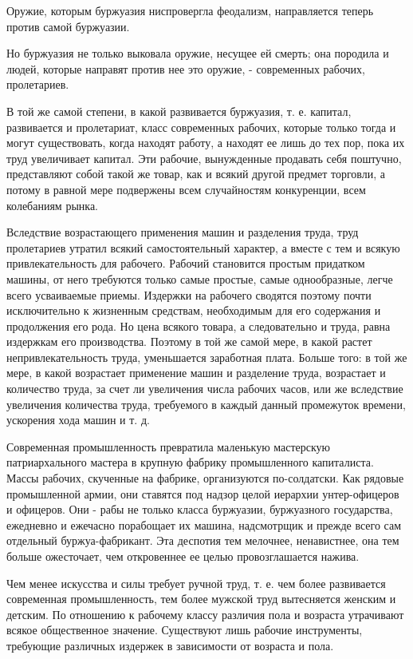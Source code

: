 \documentclass[12pt]{article}
\newcommand{\parnum}{(\arabic{parcount})}
\newcounter{parcount}
\newenvironment{parnumbers}{%
  \par%
  \everypar{\noindent \stepcounter{parcount}\marginpar[]{\parnum}}%
}{}
\begin{document}
\begin{parnumbers}
    Оружие, которым буржуазия ниспровергла феодализм, направляется теперь против самой буржуазии.

    Но буржуазия не только выковала оружие, несущее ей смерть; она породила и людей, которые направят против нее это оружие, - современных рабочих, пролетариев.

    В той же самой степени, в какой развивается буржуазия, т. е. капитал, развивается и пролетариат, класс современных рабочих, которые только тогда и могут существовать, когда находят работу, а находят ее лишь до тех пор, пока их труд увеличивает капитал. Эти рабочие, вынужденные продавать себя поштучно, представляют собой такой же товар, как и всякий другой предмет торговли, а потому в равной мере подвержены всем случайностям конкуренции, всем колебаниям рынка.

    Вследствие возрастающего применения машин и разделения труда, труд пролетариев утратил всякий самостоятельный характер, а вместе с тем и всякую привлекательность для рабочего. Рабочий становится простым придатком машины, от него требуются только самые простые, самые однообразные, легче всего усваиваемые приемы. Издержки на рабочего сводятся поэтому почти исключительно к жизненным средствам, необходимым для его содержания и продолжения его рода. Но цена всякого товара, а следовательно и труда, равна издержкам его производства. Поэтому в той же самой мере, в какой растет непривлекательность труда, уменьшается заработная плата. Больше того: в той же мере, в какой возрастает применение машин и разделение труда, возрастает и количество труда, за счет ли увеличения числа рабочих часов, или же вследствие увеличения количества труда, требуемого в каждый данный промежуток времени, ускорения хода машин и т. д.

    Современная промышленность превратила маленькую мастерскую патриархального мастера в крупную фабрику промышленного капиталиста. Массы рабочих, скученные на фабрике, организуются по-солдатски. Как рядовые промышленной армии, они ставятся под надзор целой иерархии унтер-офицеров и офицеров. Они - рабы не только класса буржуазии, буржуазного государства, ежедневно и ежечасно порабощает их машина, надсмотрщик и прежде всего сам отдельный буржуа-фабрикант. Эта деспотия тем мелочнее, ненавистнее, она тем больше ожесточает, чем откровеннее ее целью провозглашается нажива.

    Чем менее искусства и силы требует ручной труд, т. е. чем более развивается современная промышленность, тем более мужской труд вытесняется женским и детским. По отношению к рабочему классу различия пола и возраста утрачивают всякое общественное значение. Существуют лишь рабочие инструменты, требующие различных издержек в зависимости от возраста и пола.


\end{parnumbers}
\end{document}

